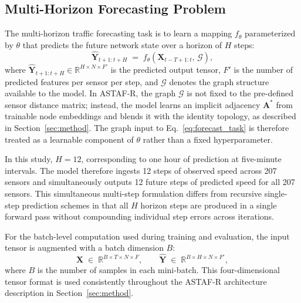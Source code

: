 \documentclass[fleqn,10pt]{wlscirep}
\begin{document}
\subsection{Multi-Horizon Forecasting Problem}

The multi-horizon traffic forecasting task is to learn a mapping
$f_{\theta}$ parameterized by $\theta$ that predicts the future
network state over a horizon of $H$ steps:
%
\begin{equation}
    \hat{\mathbf{Y}}_{t+1:t+H}
    \;=\; f_{\theta}\!\left(\mathbf{X}_{t-T+1:t},\,\mathcal{G}\right),
    \label{eq:forecast_task}
\end{equation}
%
where $\hat{\mathbf{Y}}_{t+1:t+H} \in \mathbb{R}^{H \times N \times F'}$
is the predicted output tensor, $F'$ is the number of predicted
features per sensor per step, and $\mathcal{G}$ denotes the graph
structure available to the model. In ASTAF-R, the graph $\mathcal{G}$
is not fixed to the pre-defined sensor distance matrix; instead,
the model learns an implicit adjacency $\mathbf{A}^{*}$ from
trainable node embeddings and blends it with the identity topology,
as described in Section~\ref{sec:method}. The graph input to
Eq.~\eqref{eq:forecast_task} is therefore treated as a learnable
component of $\theta$ rather than a fixed hyperparameter.

In this study, $H = 12$, corresponding to one hour of prediction
at five-minute intervals. The model therefore ingests 12 steps of
observed speed across 207 sensors and simultaneously outputs 12
future steps of predicted speed for all 207 sensors. This
simultaneous multi-step formulation differs from recursive
single-step prediction schemes in that all $H$ horizon steps are
produced in a single forward pass without compounding individual
step errors across iterations.

For the batch-level computation used during training and evaluation,
the input tensor is augmented with a batch dimension $B$:
%
\begin{equation}
    \mathbf{X} \;\in\; \mathbb{R}^{B \times T \times N \times F},
    \qquad
    \hat{\mathbf{Y}} \;\in\; \mathbb{R}^{B \times H \times N \times F'},
    \label{eq:batch_tensors}
\end{equation}
%
where $B$ is the number of samples in each mini-batch. This
four-dimensional tensor format is used consistently throughout
the ASTAF-R architecture description in Section~\ref{sec:method}.
\end{document}
